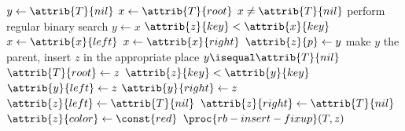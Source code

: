 \documentclass{article}
\begin{document}
\begin{codebox}
\li $y \gets{\attrib{T}{nil}}$
\li $x \gets{\attrib{T}{root}}$
\li \While $x \neq \attrib{T}{nil}$ \Comment perform regular binary search
    \Do
\li     $y \gets{x}$
\li     \If $\attrib{z}{key} < \attrib{x}{key}$
\li     \Then
            $x \gets{\attrib{x}{left}}$
\li     \Else
\li         $x \gets{\attrib{x}{right}}$
        \End
    \End
\li $\attrib{z}{p} \gets{y}$ \Comment make $y$ the parent, insert $z$ in the appropriate place
\li \If $y \isequal \attrib{T}{nil}$
\li \Then
        $\attrib{T}{root} \gets{z}$
\li \ElseIf $\attrib{z}{key} < \attrib{y}{key}$
\li \Then
        $\attrib{y}{left} \gets{z}$
\li \Else
\li     $\attrib{y}{right} \gets{z}$
    \End
\li $\attrib{z}{left} \gets{\attrib{T}{nil}}$
\li $\attrib{z}{right} \gets{\attrib{T}{nil}}$
\li $\attrib{z}{color} \gets{\const{red}}$
\li $\proc{rb-insert-fixup}(T, z)$
\end{codebox}
\end{document}
